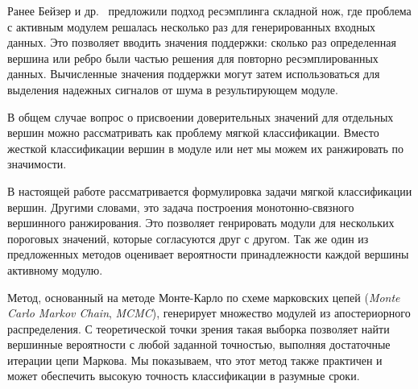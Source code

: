 Ранее Бейзер и др.~\cite{Beisser2012} предложили подход ресэмплинга складной
нож, где проблема с активным модулем решалась несколько раз для генерированных
входных данных.  Это позволяет вводить значения поддержки: сколько раз
определенная вершина или ребро были частью решения для повторно
ресэмплированных данных. Вычисленные значения поддержки могут затем
использоваться для выделения надежных сигналов от шума в результирующем модуле.

В общем случае вопрос о присвоении доверительных значений для отдельных вершин
можно рассматривать как проблему мягкой классификации. Вместо жесткой
классификации вершин в модуле или нет мы можем их ранжировать по значимости.


В настоящей работе рассматривается формулировка задачи мягкой классификации
вершин.  Другими словами, это задача построения монотонно-связного вершинного
ранжирования. Это позволяет генрировать модули для нескольких пороговых
значений, которые согласуются друг с другом. Так же один из предложенных
методов оценивает вероятности принадлежности каждой вершины активному модулю.


Метод, основанный на методе Монте-Карло по схеме марковских цепей (\emph{Monte
Carlo Markov Chain}, \emph{MCMC}), генерирует множество модулей из
апостериорного распределения.  С теоретической точки зрения такая выборка
позволяет найти вершинные вероятности с любой заданной точностью, выполняя
достаточные итерации цепи Маркова. Мы показываем, что этот метод также
практичен и может обеспечить высокую точность классификации в разумные сроки.



